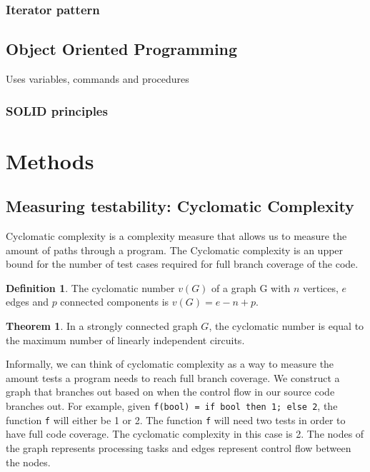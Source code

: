 \documentclass[12pt]{article}
\theoremstyle{definition}
\newtheorem*{definition}{Definition}
\theoremstyle{theorem}
\newtheorem*{theorem}{Theorem}
\begin{document}
\subsubsection{Iterator pattern}

\subsection{Object Oriented Programming}\label{oop}
Uses variables, commands and procedures

\subsubsection{SOLID principles}

\section{Methods}\label{methods}

\subsection{Measuring testability: Cyclomatic Complexity}\label{cyclomaticcomplexity}

Cyclomatic complexity is a complexity measure that allows us to measure the
amount of paths through a program. The Cyclomatic complexity is an upper bound
for the number of test cases required for full branch coverage of the code. 

\theoremstyle{definition}
\begin{definition}
The cyclomatic number $v(G)$ of a graph G with $n$ vertices, $e$ edges and $p$
connected components is $v(G) = e - n + p$.
\end{definition}

\begin{theorem}
In a strongly connected graph $G$, the cyclomatic number is equal to the
maximum number of linearly independent circuits.~\cite{McCabe}
\end{theorem}

Informally, we can think of cyclomatic complexity as a way to measure the amount
tests a program needs to reach full branch coverage. We construct a graph that
branches out based on when the control flow in our source code branches out. For
example, given \texttt{f(bool) = if bool then 1; else 2}, the function
\texttt{f} will either be 1 or 2. The function \texttt{f} will need two tests in
order to have full code coverage. The cyclomatic complexity in this case is 2.
The nodes of the graph represents processing tasks and edges represent control
flow between the nodes. 
\end{document}

